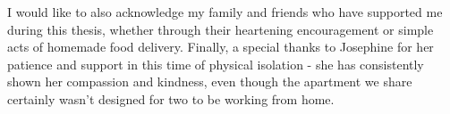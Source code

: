 \documentclass[openany]{book}
\begin{document}
I would like to also acknowledge my family and friends who have supported me during this thesis, whether through their heartening encouragement or simple acts of homemade food delivery. Finally, a special thanks to Josephine for her patience and support in this time of physical isolation - she has consistently shown her compassion and kindness, even though the apartment we share certainly wasn't designed for two to be working from home.

\tableofcontents
\listoffigures
\listoftables

\mainmatter









\newpage



\end{document}
